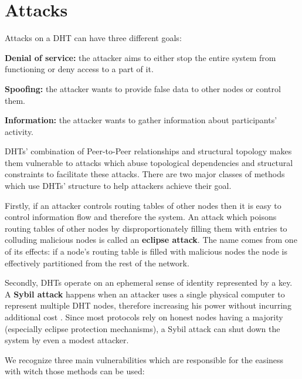 \section{Attacks}
\label{sec:dht_attacks}

  Attacks on a DHT can have three different goals:
  \begin{description}
    \item{\textbf{Denial of service:}} the attacker aims to either stop the
      entire system from functioning or deny access to a part of it.
    \item{\textbf{Spoofing:}} the attacker wants to provide false data to other
      nodes or control them.
    \item{\textbf{Information:}} the attacker wants to gather information about
      participants' activity.
  \end{description}

  DHTs' combination of Peer-to-Peer relationships and structural topology makes
  them vulnerable to attacks which abuse topological dependencies and structural
  constraints to facilitate these attacks. There are two major classes of
  methods which use DHTs' structure to help attackers achieve their goal.

  Firstly, if an attacker controls routing tables of other nodes then it is easy
  to control information flow and therefore the system. An attack which poisons
  routing tables of other nodes by disproportionately filling them with entries
  to colluding malicious nodes is called an \textbf{eclipse attack}.
  The name comes from one of its effects: if a node's routing table is filled
  with malicious nodes the node is effectively partitioned from the rest of the
  network.

  Secondly, DHTs operate on an ephemeral sense of identity represented by a key.
  A \textbf{Sybil attack} happens when an attacker uses a single physical
  computer to represent multiple DHT nodes, therefore increasing his power
  without incurring additional cost \cite{dou02}.
  Since most protocols rely on honest nodes having a majority (especially
  eclipse protection mechanisms), a Sybil attack can shut down the system by
  even a modest attacker.

  We recognize three main vulnerabilities which are responsible for the
  easiness with witch those methods can be used:

